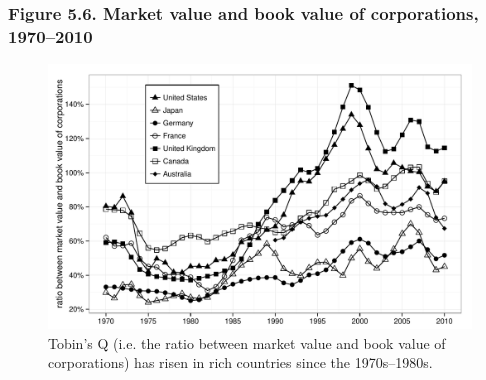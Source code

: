 \documentclass[t]{beamer}\usepackage[]{graphicx}\usepackage[]{color}
\newenvironment{knitrout}{}{} %
\begin{document}
\begin{frame}[label=Figure_5_6]
\frametitle{Figure 5.6. Market value and book value of corporations, 1970--2010}
\begin{figure}[t]
\begin{minipage}[b]{\textwidth}
\centering
\begin{knitrout}\footnotesize
{}\color{fgcolor}

{\centering \includegraphics[width=1\linewidth]{figures/bw/Figure_5_6} 

}



\end{knitrout}
\caption{Tobin's Q (i.e. the ratio between market value and book value of corporations) has risen in rich countries since the 1970s--1980s.}
\end{minipage}
\end{figure}
\end{frame}
\end{document}
